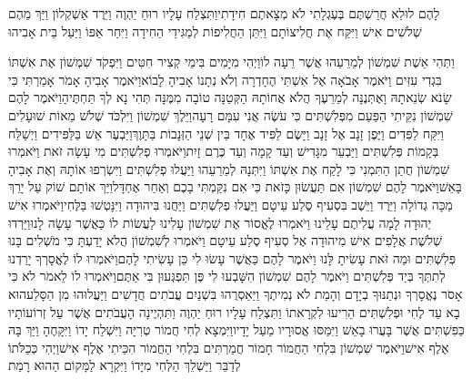 \documentclass[../main/main.tex]{subfiles}
\begin{document}
\begin{multicols*}{\ncols}
לָהֶם לוּלֵא חֲרַשְׁתֶּם בְּעֶגְלָתִי לֹא מְצָאתֶם חִידָתִי\PreVerseSpace{}וַתִּצְלַח עָלָיו רוּחַ יַהְוֶה וַיֵּרֶד אַשְׁקְלוֹן וַיַּךְ מֵהֶם שְׁלֹשִׁים אִישׁ וַיִּקַּח אֶת חֲלִיצוֹתָם וַיִּתֵּן הַחֲלִיפוֹת לְמַגִּידֵי הַחִידָה וַיִּחַר אַפּוֹ וַיַּעַל בֵּית אָבִיהוּ\OpenSection{}\par
{}וַתְּהִי אֵשֶׁת שִׁמְשׁוֹן לְמֵרֵעֵהוּ אֲשֶׁר רֵעָה לוֹ\PreChapterSpace{}וַיְהִי מִיָּמִים בִּימֵי קְצִיר חִטִּים וַיִּפְקֹד שִׁמְשׁוֹן אֶת אִשְׁתּוֹ בִּגְדִי עִזִּים וַיֹּאמֶר אָבֹאָה אֶל אִשְׁתִּי הֶחָדְרָה וְלֹא נְתָנוֹ אָבִיהָ לָבוֹא\PreVerseSpace{}וַיֹּאמֶר אָבִיהָ אָמֹר אָמַרְתִּי כִּי שָׂנֹא שְׂנֵאתָהּ וָאֶתְּנֶנָּה לְמֵרֵעֶךָ הֲלֹא אֲחוֹתָהּ הַקְּטַנָּה טוֹבָה מִמֶּנָּה תְּהִי נָא לְךָ תַּחְתֶּיהָ\PreVerseSpace{}וַיֹּאמֶר לָהֶם שִׁמְשׁוֹן נִקֵּיתִי הַפַּעַם מִפְּלִשְׁתִּים כִּי עֹשֶׂה אֲנִי עִמָּם רָעָה\PreVerseSpace{}וַיֵּלֶךְ שִׁמְשׁוֹן וַיִּלְכֹּד שְׁלֹשׁ מֵאוֹת שׁוּעָלִים וַיִּקַּח לַפִּדִים וַיֶּפֶן זָנָב אֶל זָנָב וַיָּשֶׂם לַפִּיד אֶחָד בֵּין שְׁנֵי הַזְּנָבוֹת בַּתָּוֶךְ\PreVerseSpace{}וַיַּבְעֶר אֵשׁ בַּלַּפִּידִים וַיְשַׁלַּח בְּקָמוֹת פְּלִשְׁתִּים וַיַּבְעֵר מִגָּדִישׁ וְעַד קָמָה וְעַד כֶּרֶם זָיִת\PreVerseSpace{}וַיֹּאמְרוּ פְלִשְׁתִּים מִי עָשָׂה זֹאת וַיֹּאמְרוּ שִׁמְשׁוֹן חֲתַן הַתִּמְנִי כִּי לָקַח אֶת אִשְׁתּוֹ וַיִּתְּנָהּ לְמֵרֵעֵהוּ וַיַּעֲלוּ פְלִשְׁתִּים וַיִּשְׂרְפוּ אוֹתָהּ וְאֶת אָבִיהָ בָּאֵשׁ\PreVerseSpace{}וַיֹּאמֶר לָהֶם שִׁמְשׁוֹן אִם תַּעֲשׂוּן כָּזֹאת כִּי אִם נִקַּמְתִּי בָכֶם וְאַחַר אֶחְדָּל\PreVerseSpace{}וַיַּךְ אוֹתָם שׁוֹק עַל יָרֵךְ מַכָּה גְדוֹלָה וַיֵּרֶד וַיֵּשֶׁב בִּסְעִיף סֶלַע עֵיטָם \ClosedSection{}וַיַּעֲלוּ פְלִשְׁתִּים וַיַּחֲנוּ בִּיהוּדָה וַיִּנָּטְשׁוּ בַּלֶּחִי\PreVerseSpace{}וַיֹּאמְרוּ אִישׁ יְהוּדָה לָמָה עֲלִיתֶם עָלֵינוּ וַיֹּאמְרוּ לֶאֱסוֹר אֶת שִׁמְשׁוֹן עָלִינוּ לַעֲשׂוֹת לוֹ כַּאֲשֶׁר עָשָׂה לָנוּ\PreVerseSpace{}וַיֵּרְדוּ שְׁלֹשֶׁת אֲלָפִים אִישׁ מִיהוּדָה אֶל סְעִיף סֶלַע עֵיטָם וַיֹּאמְרוּ לְשִׁמְשׁוֹן הֲלֹא יָדַעְתָּ כִּי מֹשְׁלִים בָּנוּ פְּלִשְׁתִּים וּמַה זֹּאת עָשִׂיתָ לָּנוּ וַיֹּאמֶר לָהֶם כַּאֲשֶׁר עָשׂוּ לִי כֵּן עָשִׂיתִי לָהֶם\PreVerseSpace{}וַיֹּאמְרוּ לוֹ לֶאֱסָרְךָ יָרַדְנוּ לְתִתְּךָ בְּיַד פְּלִשְׁתִּים וַיֹּאמֶר לָהֶם שִׁמְשׁוֹן הִשָּׁבְעוּ לִי פֶּן תִּפְגְּעוּן בִּי אַתֶּם\PreVerseSpace{}וַיֹּאמְרוּ לוֹ לֵאמֹר לֹא כִּי אָסֹר נֶאֱסָרְךָ וּנְתַנּוּךָ בְיָדָם וְהָמֵת לֹא נְמִיתֶךָ וַיַּאַסְרֻהוּ בִּשְׁנַיִם עֲבֹתִים חֲדָשִׁים וַיַּעֲלוּהוּ מִן הַסָּלַע\PreVerseSpace{}הוּא בָא עַד לֶחִי וּפְלִשְׁתִּים הֵרִיעוּ לִקְרָאתוֹ וַתִּצְלַח עָלָיו רוּחַ יַהְוֶה וַתִּהְיֶינָה הָעֲבֹתִים אֲשֶׁר עַל זְרוֹעוֹתָיו כַּפִּשְׁתִּים אֲשֶׁר בָּעֲרוּ בָאֵשׁ וַיִּמַּסּוּ אֱסוּרָיו מֵעַל יָדָיו\PreVerseSpace{}וַיִּמְצָא לְחִי חֲמוֹר טְרִיָּה וַיִּשְׁלַח יָדוֹ וַיִּקָּחֶהָ וַיַּךְ בָּהּ אֶלֶף אִישׁ\PreVerseSpace{}וַיֹּאמֶר שִׁמְשׁוֹן בִּלְחִי הַחֲמוֹר חָמוֹר חֲמַרְתִּים\SubEnd{} בִּלְחִי הַחֲמוֹר הִכֵּיתִי אֶלֶף אִישׁ\PreVerseSpace{}וַיְהִי כְּכַלֹּתוֹ לְדַבֵּר וַיַּשְׁלֵךְ הַלְּחִי מִיָּדוֹ וַיִּקְרָא לַמָּקוֹם הַהוּא רָמַת 
\end{multicols*}
\end{document}
